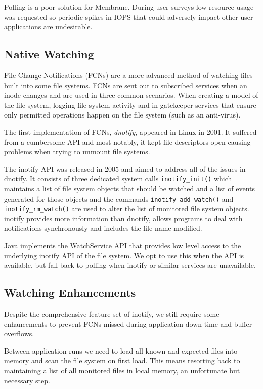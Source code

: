 \documentclass[11pt, a4paper, twocolumn, twoside]{report}
\def\code#1{\texttt{#1}}
\begin{document}
Polling is a poor solution for Membrane. During user surveys low resource usage was requested so periodic spikes in IOPS that could adversely impact other user applications are undesirable.

\subsection{Native Watching}

File Change Notifications (FCNs) are a more advanced method of watching files built into some file systems. FCNs are sent out to subscribed services when an inode changes and are used in three common scenarios. When creating a model of the file system, logging file system activity and in gatekeeper services that ensure only permitted operations happen on the file system (such as an anti-virus). \citep{kerrisk2014fcn}

The first implementation of FCNs, \emph{dnotify}, appeared in Linux in 2001. It suffered from a cumbersome API and most notably, it kept file descriptors open causing problems when trying to unmount file systems. \citep{kerrisk2014fcn}

The inotify API was released in 2005 and aimed to address all of the issues in dnotify. It consists of three dedicated system calls \code{inotify\_init()} which maintains a list of file system objects that should be watched and a list of events generated for those objects and the commands \code{inotify\_add\_watch()} and \code{inotify\_rm\_watch()} are used to alter the list of monitored file system objects. inotify provides more information than dnotify, allows programs to deal with notifications synchronously and includes the file name modified. \citep{kerrisk2014fcn}

Java implements the WatchService API that provides low level access to the underlying inotify API of the file system. \citep{oracle2017dir} We opt to use this when the API is available, but fall back to polling when inotify or similar services are unavailable.

\subsection{Watching Enhancements}

Despite the comprehensive feature set of inotify, we still require some enhancements to prevent FCNs missed during application down time and buffer overflows. 

Between application runs we need to load all known and expected files into memory and scan the file system on first load. This means resorting back to maintaining a list of all monitored files in local memory, an unfortunate but necessary step.
\end{document}
